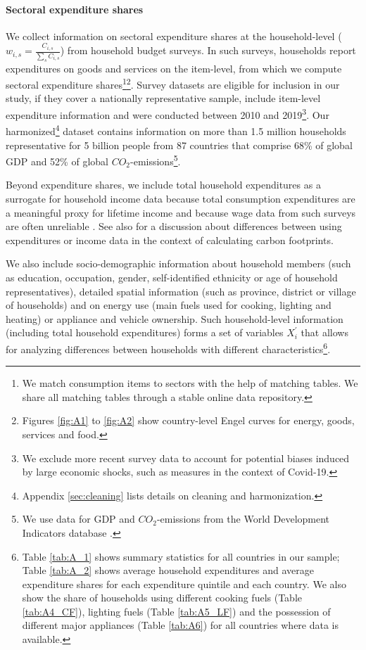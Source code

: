 \documentclass[12pt, a4paper]{article}
\begin{document}
\paragraph{Sectoral expenditure shares} We collect information on sectoral expenditure shares at the household-level ($w_{i,s}=\frac{C_{i,s}}{\sum_{s}C_{i,s}}$) from household budget surveys. In such surveys, households report expenditures on goods and services on the item-level, from which we compute sectoral expenditure shares\footnote{We match consumption items to sectors with the help of matching tables. We share all matching tables through a stable online data repository.}\footnote{Figures \ref{fig:A1} to \ref{fig:A2} show country-level Engel curves for energy, goods, services and food.}.
Survey datasets are eligible for inclusion in our study, if they cover a nationally representative sample, include item-level expenditure information and were conducted between 2010 and 2019\footnote{We exclude more recent survey data to account for potential biases induced by large economic shocks, such as measures in the context of Covid-19.}. Our harmonized\footnote{Appendix \ref{sec:cleaning} lists details on cleaning and harmonization.} dataset contains information on more than 1.5 million households representative for 5 billion people from 87 countries that comprise 68\% of global GDP and 52\% of global $CO_{2}$-emissions\footnote{We use data for GDP and $CO_{2}$-emissions from the World Development Indicators database \autocite{WorldBankGroup.2023}.}.

Beyond expenditure shares, we include total household expenditures as a surrogate for household income data because total consumption expenditures are a meaningful proxy for lifetime income \autocite{Poterba.1989,JamesM.Poterba.2016} and because wage data from such surveys are often unreliable \autocite{Blundell.1998}. See also \textcite{Levay.2023} for a discussion about differences between using expenditures or income data in the context of calculating carbon footprints.

We also include socio-demographic information about household members (such as education, occupation, gender, self-identified ethnicity or age of household representatives), detailed spatial information (such as province, district or village of households) and on energy use (main fuels used for cooking, lighting and heating) or appliance and vehicle ownership. Such household-level information (including total household expenditures) forms a set of variables $X_{i}^{'}$ that allows for analyzing differences between households with different characteristics\footnote{Table \ref{tab:A_1} shows summary statistics for all countries in our sample; Table \ref{tab:A_2} shows average household expenditures and average expenditure shares for each expenditure quintile and each country. We also show the share of households using different cooking fuels (Table \ref{tab:A4_CF}), lighting fuels (Table \ref{tab:A5_LF}) and the possession of different major appliances (Table \ref{tab:A6}) for all countries where data is available.}. 
\end{document}
